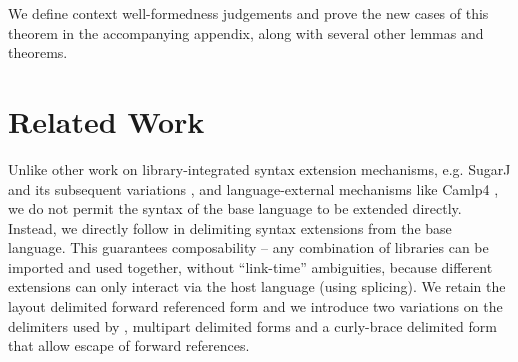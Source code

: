 \documentclass{sig-alternate}
\begin{document}
We define context well-formedness judgements and prove the new cases of this theorem in the accompanying appendix, along with several other lemmas and theorems.%





%

\section{Related Work}\label{related}
Unlike other work on library-integrated syntax extension mechanisms, e.g. SugarJ and its subsequent variations \cite{erdweg2013framework}, and language-external mechanisms like Camlp4 \cite{ocaml-manual}, we do not permit the syntax of the base language to be extended directly. Instead, we directly follow \cite{TSLs} in delimiting syntax extensions from the base language. This guarantees composability -- any combination of  libraries can be imported and used together, without ``link-time'' ambiguities, because different extensions can only interact via the host language (using splicing). We retain the layout delimited forward referenced form and we introduce two variations on the delimiters used by \cite{TSLs}, multipart delimited forms and a curly-brace delimited form that allow escape of forward references. 
\end{document}
